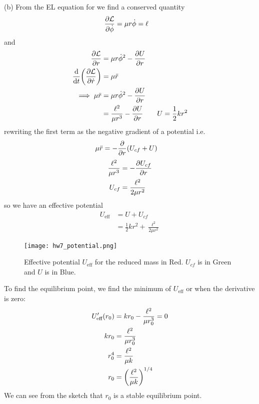 \documentclass[../hw.tex]{subfiles}
\begin{document}
(b) From the EL equation for we find a conserved quantity
\begin{align*}
    \pdv{\mathcal{L}}{\dot{\phi}} &= \mu r \dot \phi = \ell
\end{align*}
and
\begin{align*}
    \pdv{\mathcal{L}}{r} &= \mu r \dot\phi^2 - \pdv{U}{r} \\
    \dv{t}(\pdv{\mathcal{L}}{\dot r}) &= \mu \ddot{r} \\
    \implies \mu \ddot r &= \mu r \dot\phi^2 - \pdv{U}{r} \\
    &= \frac{\ell^2}{\mu r^3} - \pdv{U}{r} \qquad U = \frac{1}{2} k r^2
\end{align*}
rewriting the first term as the negative gradient of a potential i.e.
\begin{align*}
    \mu \ddot r &= -\pdv{r}(U_{cf} + U)
\end{align*}
\begin{align*}
    \frac{\ell^2}{\mu r^3} &= -\pdv{U_{cf}}{r} \\
    U_{cf} &= \frac{\ell^2}{2\mu r^2}
\end{align*}
so we have an effective potential
\begin{align*}
    U_{\text{eff}} &= U + U_{cf} \\
    &= \frac{1}{2} k r^2 + \frac{\ell^2}{2\mu r^2}
\end{align*}
\begin{figure}[ht]
    \centering
    \texttt{[image: hw7\_potential.png]}
    \caption{Effective potential $U_{\text{eff}}$ for the reduced mass in Red. $U_{cf}$ is in Green
    and $U$ is in Blue.}
    \label{fig:hw7_1}
\end{figure}

To find the equilibrium point, we find the minimum of $U_{\text{eff}}$ or when the derivative is zero:
\begin{align*}
    U'_{\text{eff}}(r_0) &= kr_0 - \frac{\ell^2}{\mu r_0^3} = 0 \\
    kr_0 &= \frac{\ell^2}{\mu r_0^3} \\
    r_0^4 &= \frac{\ell^2}{\mu k} \\
    r_0 &= \qt(\frac{\ell^2}{\mu k})^{1/4}
\end{align*}
We can see from the sketch that $r_0$ is a stable equilibrium point.
\end{document}
